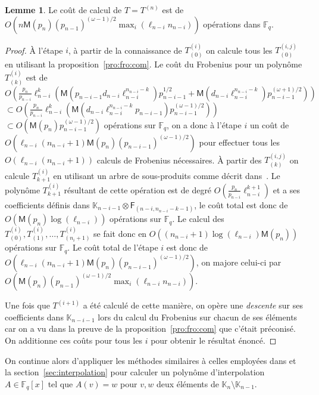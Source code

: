 \documentclass[10pt,a4paper]{book}
\theoremstyle{plain}
\theoremstyle{definition}
\newtheorem{lem}[thm]{Lemme}
\theoremstyle{definition}
\theoremstyle{definition}
\theoremstyle{definition}
\theoremstyle{remark}
\theoremstyle{remark}
\theoremstyle{definition}
\begin{document}
\begin{lem}\label{lem:interpolation:minpoly:ult}
  Le coût de calcul de $T=T^{(n)}$ est de 
  $O(n\mathsf{M}(p_n)(p_{n-1})^{(\omega-1)/2} \max_i(\ell_{n-i}n_{n-i}))$
  opérations dans $\mathbb{F}_q$.
\end{lem}

\begin{proof}
  \`A l'étape $i$, à partir de la connaissance de $T^{(i)}_{(0)}$ on  calcule tous 
  les $T^{(i,j)}_{(0)}$ en utilisant la proposition~\ref{pro:fro:com}. Le coût du 
  Frobenius pour un polynôme $T^{(i)}_{(k)}$ est de 
  $O(\frac{p_n}{p_{n-i}}\ell_{n-i}^{k}(\mathsf{M}(p_{n-i-1}d_{n-i}\ell_{n-i}^{n_{n-i}-k})p_{n-i-1}^{1/2}+\mathsf{M}(d_{n-i}\ell_{n-i}^{n_{n-i}-k})p_{n-i-1}^{(\omega+1)/2}))$ 
  $\subset O(\frac{p_n}{p_{n-i}}\ell_{n-i}^{k}(\mathsf{M}(d_{n-i}\ell_{n-i}^{n_{n-i}-k}p_{n-i-1})p_{n-i-1}^{(\omega-1)/2}))$ 
  $\subset O(\mathsf{M}(p_n)p_{n-i-1}^{(\omega - 1)/2})$ opérations sur 
  $\mathbb{F}_q$, on a donc à l'étape $i$ un coût de $O(\ell_{n-i}(n_{n-i}+1)\mathsf{M}(p_n)(p_{n-i-1})^{(\omega - 1)/2})$ 
  pour effectuer tous les $O(\ell_{n-i}(n_{n-i}+1))$ calculs de Frobenius nécessaires.
  \`A partir des $T^{(i,j)}_{(k)}$ on calcule $T^{(i)}_{k+1}$ en utilisant un arbre de 
  sous-produits comme décrit dans~\cite[Lemma~10.4]{vzGJG03}. Le polynôme 
  $T^{(i)}_{k+1}$ résultant de cette opération est de degré 
  $O(\frac{p_n}{p_{n-i}}\ell_{n-i}^{k+1})$ et a ses 
  coefficients définis dans $\mathbb{K}_{n-i-1} \otimes \mathsf{F}_{(n-i,n_{n-i}-k-1)}$,
  le coût total est donc de 
  $O(\mathsf{M}(p_n)\log(\ell_{n-i}))$ opérations sur $\mathbb{F}_q$. 
  Le calcul des $T^{(i)}_{(0)},T^{(i)}_{(1)}, \dots, T^{(i)}_{(n_i+1)}$ se fait
  donc en $O((n_{n-i}+1) \log(\ell_{n-i})\mathsf{M}(p_n))$ opérations sur 
  $\mathbb{F}_{q}$.
  Le coût total de l'étape $i$ est donc de 
  $O(\ell_{n-i}(n_{n-i}+1)\mathsf{M}(p_n)(p_{n-i-1})^{(\omega-1)/2})$,
  on majore celui-ci par 
  $O(\mathsf{M}(p_n)(p_{n-1})^{(\omega-1)/2} \max_i(\ell_{n-i}n_{n-i}))$.
  
  Une fois que $T^{(i+1)}$ a été calculé de cette manière, on opère une 
  \emph{descente} sur ses coefficients dans $\mathbb{K}_{n-i-1}$ lors du calcul
  du Frobenius sur chacun de ses éléments car on a vu dans la preuve de la 
  proposition~\ref{pro:fro:com} que c'était préconisé.
  On additionne ces coûts pour tous les $i$ pour obtenir le résultat 
  énoncé. 
\end{proof}
 
 On continue alors d'appliquer les méthodes similaires à celles employées dans 
 \cite{DeFeo10} et la section~\ref{sec:interpolation} pour calculer un polynôme 
 d'interpolation $A \in \mathbb{F}_q[x]$ tel que $A(v)=w$ pour $v,w$ deux 
 éléments de $\mathbb{K}_{n} \setminus \mathbb{K}_{n-1}$.
 
\end{document}

